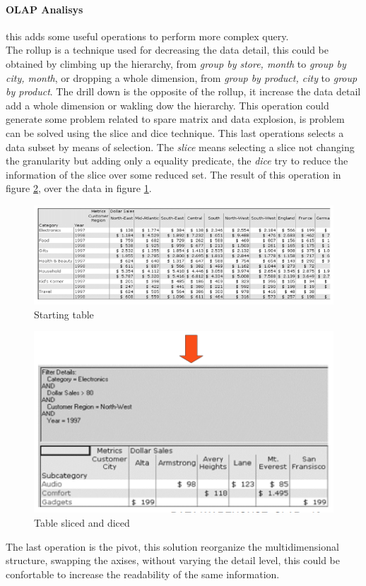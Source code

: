 \documentclass[12pt]{article}
\begin{document}
\paragraph{OLAP Analisys} this adds some useful operations to perform more complex query.\\
The rollup is a technique used for decreasing the data detail, this could be obtained by climbing up the hierarchy, from \textit{group by store, month} to \textit{group by city, month}, or dropping a whole dimension, from \textit{group by product, city} to \textit{group by product}. The drill down is the opposite of the rollup, it increase the data detail add a whole dimension or wakling dow the hierarchy. This operation could generate some problem related to spare matrix and data explosion, is problem can be solved using the slice and dice technique. This last operations selects a data subset by means of selection. The \textit{slice} means selecting a slice not changing the granularity but adding only a equality predicate, the \textit{dice} try to reduce the information of the slice over some reduced set. The result of this operation in figure \ref{fig:sd}, over the data in figure \ref{fig:sd_start}.
\begin{figure}[h!]
  \includegraphics[width=\linewidth]{images/sd_start.png}
  \caption{Starting table}
  \label{fig:sd_start}
\end{figure}
\begin{figure}[h!]
  \centering
  \includegraphics[width=0.8\linewidth]{images/sd.png}
  \caption{Table sliced and diced}
  \label{fig:sd}
\end{figure}
The last operation is the pivot, this solution reorganize the multidimensional structure, swapping the axises, without varying the detail level, this could be confortable to increase the readability of the same information.
\end{document}
